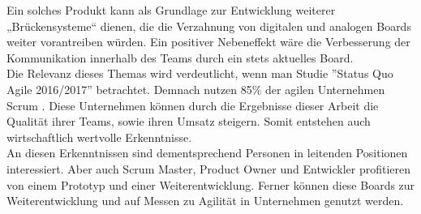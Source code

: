 \documentclass[12pt,titlepage]{scrartcl}
\begin{document}
Ein solches Produkt kann als Grundlage zur Entwicklung weiterer „Brückensysteme“ dienen, die die Verzahnung von digitalen und analogen Boards weiter vorantreiben würden. Ein positiver Nebeneffekt wäre die Verbesserung der Kommunikation innerhalb des Teams durch ein stets aktuelles Board. \\
Die Relevanz dieses Themas wird verdeutlicht, wenn man Studie ''Status Quo Agile 2016/2017'' betrachtet. Demnach nutzen 85\% der agilen Unternehmen Scrum \cite{hskob}. Diese Unternehmen können durch die Ergebnisse dieser Arbeit die Qualität ihrer Teams, sowie ihren Umsatz steigern. Somit entstehen auch wirtschaftlich wertvolle Erkenntnisse. \\
An diesen Erkenntnissen sind dementsprechend Personen in leitenden Positionen interessiert. Aber auch Scrum Master, Product Owner und Entwickler profitieren von einem Prototyp und einer Weiterentwicklung. Ferner können diese Boards zur Weiterentwicklung und auf Messen zu Agilität in Unternehmen genutzt werden. \\ \\
\newpage


 	
\end{document}
